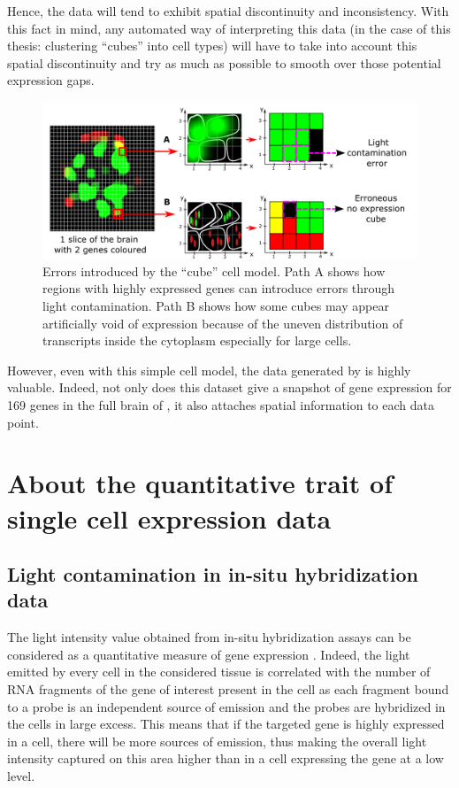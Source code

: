   Hence, the data will tend to exhibit spatial discontinuity and inconsistency. With this fact in mind, any automated way of interpreting this data (in the case of this thesis: clustering ``cubes'' into cell types) will have to take into account this spatial discontinuity and try as much as possible to smooth over those potential expression gaps.\\
  
    \begin{figure}[h]
\centerline{\includegraphics[width=1.3\linewidth]{gfx/chapter2/cubeserrors.png}}
\caption{Errors introduced by the ``cube'' cell model. Path A shows how regions with highly expressed genes can introduce errors through light contamination. Path B shows how some cubes may appear artificially void of expression because of the uneven distribution of transcripts inside the cytoplasm especially for large cells.}\label{fig:cubeserrors}
	\end{figure}
	
	However, even with this simple cell model, the data generated by \citep{Tomer10} is highly valuable. Indeed, not only does this dataset give a snapshot of gene expression for 169 genes in the full brain of \platy{}, it also attaches spatial information to each data point.\\


\section{About the quantitative trait of single cell expression data}\label{sec:quantitative_single_cell}
  \subsection{Light contamination in in-situ hybridization data}
  The light intensity value obtained from in-situ hybridization assays can be considered as a quantitative measure of gene expression \citep{dorresteijn90}. Indeed, the light emitted by every cell in the considered tissue is correlated with the number of RNA fragments of the gene of interest present in the cell as each fragment bound to a probe is an independent source of emission and the probes are hybridized in the cells in large excess. This means that if the targeted gene is highly expressed in a cell, there will be more sources of emission, thus making the overall light intensity captured on this area higher than in a cell expressing the gene at a low level. \\
  
